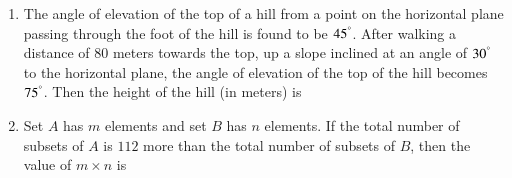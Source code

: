 \documentclass[journal]{IEEEtran}
\begin{document}
\begin{enumerate}
    \item The angle of elevation of the top of a hill from a point on the horizontal plane passing through the foot of the hill is found to be $45^\degree$. After walking a distance of $80$ meters towards the top, up a slope inclined at an angle of $30^\degree$ to the horizontal plane, the angle of elevation of the top of the hill becomes $75^\degree$. Then the height of the hill (in meters) is \\
    
    \item Set $A$ has $m$ elements and set $B$ has $n$ elements. If the total number of subsets of $A$ is $112$ more than the total number of subsets of $B$, then the value of $m\times n$ is
\end{enumerate}
\end{document}

